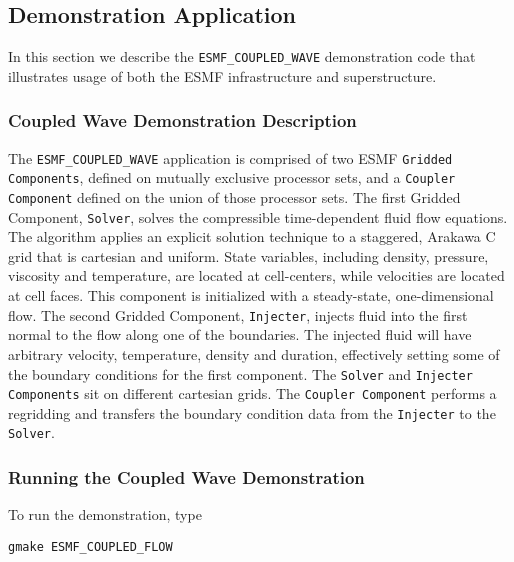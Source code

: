 \subsection{Demonstration Application}
\label{sec:demo}

In this section we describe the {\tt ESMF\_COUPLED\_WAVE} demonstration 
code that illustrates usage of both the ESMF infrastructure and superstructure. 
\subsubsection{Coupled Wave Demonstration Description}

The {\tt ESMF\_COUPLED\_WAVE} application is comprised of two ESMF 
{\tt Gridded Components}, defined on mutually exclusive processor sets, 
and a {\tt Coupler Component} defined on the union of those processor sets.  
The first Gridded Component, {\tt Solver}, solves the compressible 
time-dependent fluid flow equations.  The algorithm 
applies an explicit solution technique to a staggered, Arakawa C grid 
that is cartesian and uniform.  State variables, including density, 
pressure, viscosity and temperature, are located at cell-centers, while 
velocities are located at cell faces.  This component is initialized 
with a steady-state, one-dimensional flow.  The second Gridded Component, 
{\tt Injecter}, injects fluid into the first normal to the flow along 
one of the boundaries.  The injected fluid will have arbitrary velocity, 
temperature, density and duration, effectively setting some of 
the boundary conditions for the first component.  The {\tt Solver} and 
{\tt Injecter Components} sit on different cartesian grids.  The
{\tt Coupler Component} performs a regridding and transfers the 
boundary condition data from the {\tt Injecter} to the {\tt Solver}.

\subsubsection{Running the Coupled Wave Demonstration}

To run the demonstration, type 

\begin{verbatim}
gmake ESMF_COUPLED_FLOW
\end{verbatim}































